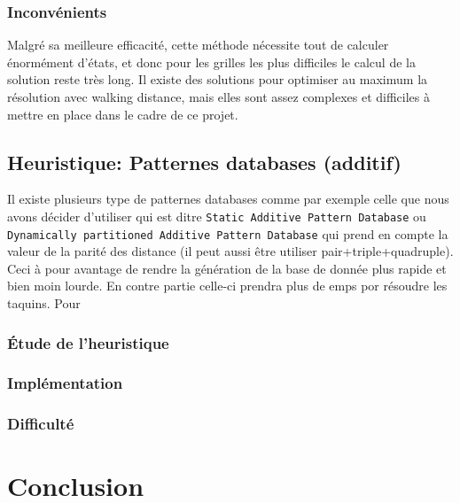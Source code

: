 \documentclass[a4paper, 12pt]{article}
\begin{document}
    \subsubsection{Inconvénients}
    
    Malgré sa meilleure efficacité, cette méthode nécessite tout de calculer énormément d'états, et donc pour les grilles les plus difficiles le calcul de la solution reste très long.
    Il existe des solutions pour optimiser au maximum la résolution avec walking distance, mais elles sont assez complexes et difficiles à mettre en place dans le cadre de ce projet.

    \subsection{Heuristique: Patternes databases (additif)}
    Il existe plusieurs type de patternes databases comme par exemple celle que nous avons décider d'utiliser qui est ditre \lstinline{Static Additive Pattern Database} ou \lstinline{Dynamically partitioned Additive Pattern Database} qui prend en compte la valeur de la parité des distance (il peut aussi être utiliser pair+triple+quadruple). Ceci à pour avantage de rendre la génération de la base de donnée plus rapide et bien moin lourde. En contre partie celle-ci prendra plus de emps por résoudre les taquins. Pour 


    \subsubsection{Étude de l'heuristique}
    
    \subsubsection{Implémentation}
    
    \subsubsection{Difficulté}

    \section{Conclusion}
\end{document}
